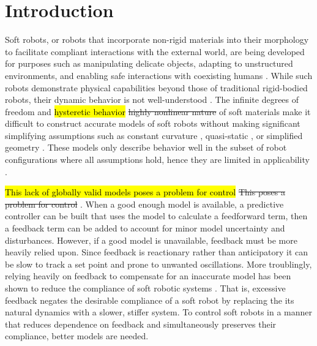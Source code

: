 \section{Introduction}
\label{sec:intro}

Soft robots, or robots that incorporate non-rigid materials into their morphology to facilitate compliant interactions with the external world, are being developed for purposes such as manipulating delicate objects, adapting to unstructured environments, and enabling safe interactions with coexisting humans \cite{rus2015design}.
While such robots demonstrate physical capabilities beyond those of traditional rigid-bodied robots, their dynamic behavior is not well-understood \cite{george2018control} .
The infinite degrees of freedom and \hl{hysteretic behavior} \sout{highly nonlinear nature} of soft materials make it difficult to construct accurate models of soft robots without making significant simplifying assumptions such as constant curvature \cite{rus2015design}, quasi-static \cite{george2018control}, or simplified geometry \cite{bruder2017model} .
These models 
only describe behavior well in the subset of robot configurations where all assumptions hold, hence they are limited in applicability .

\hl{This lack of globally valid models poses a problem for control}
\sout{This poses a problem for control} .
When a good enough model is available, a predictive controller can be built that uses the model to calculate a feedforward term, then a feedback term can be added to account for minor model uncertainty and disturbances.
However, if a good model is unavailable, feedback must be more heavily relied upon.
Since feedback is reactionary rather than anticipatory it can be slow to track a set point and prone to unwanted oscillations.
More troublingly, relying heavily on feedback to compensate for an inaccurate model has been shown to reduce the compliance of soft robotic systems \cite{della2017controlling}.
That is, excessive feedback negates the desirable compliance of a soft robot by replacing the its natural dynamics with a slower, stiffer system.
To control soft robots in a manner that reduces dependence on feedback and simultaneously preserves their compliance, better models are needed.

